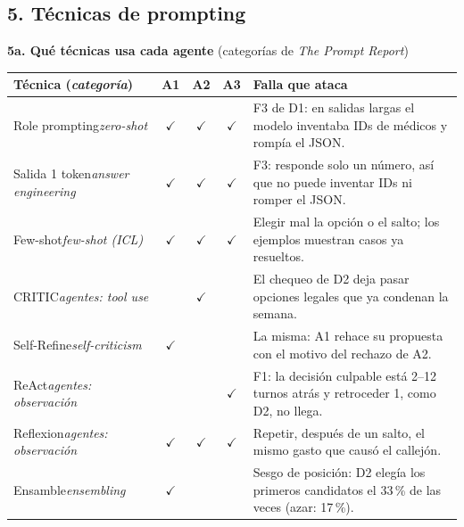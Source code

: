 \documentclass[9pt,a4paper]{extarticle}
\newcommand{\tabfont}{\fontsize{6.7}{7.7}\selectfont\setlength{\tabcolsep}{2.6pt}}
\begin{document}
\begin{multicols}{2}
\section{5. Técnicas de prompting}
\textbf{5a. Qué técnicas usa cada agente} (categorías de \emph{The Prompt Report})\par
{\tabfont
\begin{tabularx}{\linewidth}{@{}L{25mm}cccY@{}}
\toprule
\textbf{Técnica} (\emph{categoría}) & \textbf{A1} & \textbf{A2} & \textbf{A3} & \textbf{Falla que ataca} \\
\midrule
Role prompting\newline\emph{zero-shot} & $\checkmark$ & $\checkmark$ & $\checkmark$ & F3 de D1: en salidas largas el modelo inventaba IDs de médicos y rompía el JSON. \\
\addlinespace[1pt]
Salida 1 token\newline\emph{answer engineering} & $\checkmark$ & $\checkmark$ & $\checkmark$ & F3: responde solo un número, así que no puede inventar IDs ni romper el JSON. \\
\addlinespace[1pt]
Few-shot\newline\emph{few-shot (ICL)} & $\checkmark$ & $\checkmark$ & $\checkmark$ & Elegir mal la opción o el salto; los ejemplos muestran casos ya resueltos. \\
\addlinespace[1pt]
CRITIC\newline\emph{agentes: tool use} & & $\checkmark$ & & El chequeo de D2 deja pasar opciones legales que ya condenan la semana. \\
\addlinespace[1pt]
Self-Refine\newline\emph{self-criticism} & $\checkmark$ & & & La misma: A1 rehace su propuesta con el motivo del rechazo de A2. \\
\addlinespace[1pt]
ReAct\newline\emph{agentes: observación} & & & $\checkmark$ & F1: la decisión culpable está 2--12 turnos atrás y retroceder 1, como D2, no llega. \\
\addlinespace[1pt]
Reflexion\newline\emph{agentes: observación} & $\checkmark$ & $\checkmark$ & $\checkmark$ & Repetir, después de un salto, el mismo gasto que causó el callejón. \\
\addlinespace[1pt]
Ensamble\newline\emph{ensembling} & $\checkmark$ & & & Sesgo de posición: D2 elegía los primeros candidatos el 33\,\% de las veces (azar: 17\,\%). \\
\bottomrule

\end{tabularx}}
\end{multicols}
\end{document}
